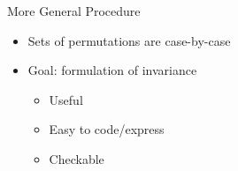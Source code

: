 \documentclass[usenames,dvipsnames]{beamer}
\newcommand{\e}{\emptyset}
\begin{document}
% 
% 

\begin{frame}[fragile]{More General Procedure}
  \begin{itemize}
    \item Sets of permutations are case-by-case
    \item Goal: formulation of invariance
    \begin{itemize}
      \item Useful
      \item Easy to code/express
      \item Checkable
    \end{itemize}
  \end{itemize}
\end{frame}
\end{document}
